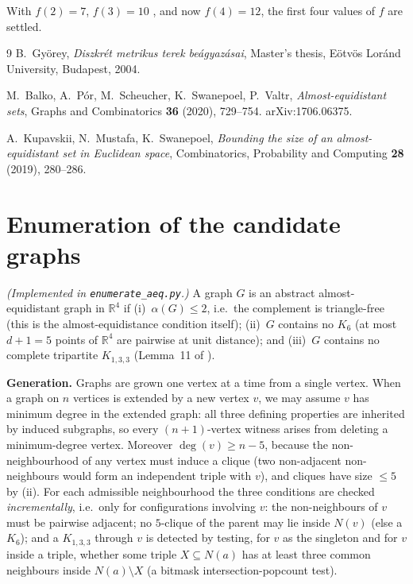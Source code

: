\documentclass[11pt]{article}
\newcommand{\R}{\mathbb{R}}
\begin{document}
With $f(2)=7$, $f(3)=10$ \cite{Gyorey}, and now $f(4)=12$, the first four
values of $f$ are settled.

\begin{thebibliography}{9}\small
{} B.~Gy\"orey,
\emph{Diszkr\'et metrikus terek be\'agyaz\'asai}, Master's thesis,
E\"otv\"os Lor\'and University, Budapest, 2004.

 M.~Balko, A.~P\'or, M.~Scheucher, K.~Swanepoel, P.~Valtr,
\emph{Almost-equidistant sets}, Graphs and Combinatorics \textbf{36} (2020),
729--754. arXiv:1706.06375.

 A.~Kupavskii, N.~Mustafa, K.~Swanepoel,
\emph{Bounding the size of an almost-equidistant set in Euclidean space},
Combinatorics, Probability and Computing \textbf{28} (2019), 280--286.
\end{thebibliography}

\appendix

\section{Enumeration of the candidate graphs}
\label{app:enum}

\emph{(Implemented in \texttt{enumerate\_aeq.py}.)}
A graph $G$ is an abstract almost-equidistant graph in $\R^4$ if
(i)~$\alpha(G)\le 2$, i.e.\ the complement is triangle-free (this is the
almost-equidistance condition itself); (ii)~$G$ contains no $K_6$ (at most
$d{+}1=5$ points of $\R^4$ are pairwise at unit distance); and (iii)~$G$
contains no complete tripartite $K_{1,3,3}$ (Lemma~11 of \cite{BPSSV}).

\textbf{Generation.} Graphs are grown one vertex at a time from a single
vertex. When a graph on $n$ vertices is extended by a new vertex $v$, we may
assume $v$ has minimum degree in the extended graph: all three defining
properties are inherited by induced subgraphs, so every $(n{+}1)$-vertex
witness arises from deleting a minimum-degree vertex. Moreover
$\deg(v)\ge n-5$, because the non-neighbourhood of any vertex must induce a
clique (two non-adjacent non-neighbours would form an independent triple with
$v$), and cliques have size $\le 5$ by (ii). For each admissible neighbourhood
the three conditions are checked \emph{incrementally}, i.e.\ only for
configurations involving $v$: the non-neighbours of $v$ must be pairwise
adjacent; no $5$-clique of the parent may lie inside $N(v)$ (else a $K_6$);
and a $K_{1,3,3}$ through $v$ is detected by testing, for $v$ as the singleton
and for $v$ inside a triple, whether some triple $X\subseteq N(a)$ has at
least three common neighbours inside $N(a)\setminus X$ (a bitmask
intersection-popcount test).
\end{document}
